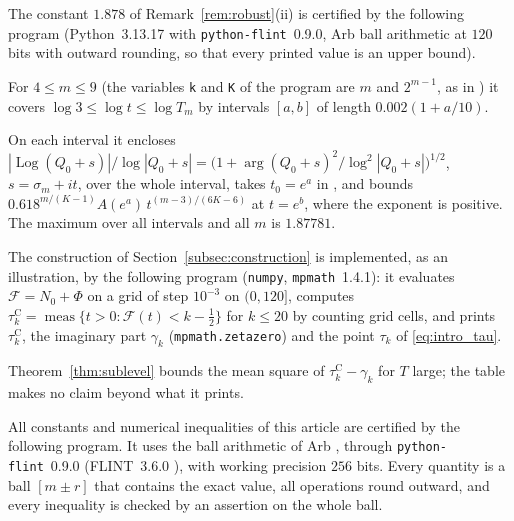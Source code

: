 \documentclass[11pt,a4paper]{article}
\makeatletter
\numberwithin{equation}{section}
\DeclareRobustCommand{\CGref}[1]{\ref{#1}}
\DeclareRobustCommand{\CGeqref}[1]{\eqref{#1}}
\DeclareRobustCommand{\CGcite}[2][]{\if\relax\detokenize{#1}\relax\cite{#2}\else\cite[#1]{#2}\fi}
\let\CG@origref\ref
\let\CG@origeqref\eqref
\newcommand{\CG@gettip}[1]{\@ifundefined{CGTip@#1}{#1}{\csname CGTip@#1\endcsname}}
\newcommand{\CG@getbib}[1]{\@ifundefined{CGBib@#1}{#1}{\csname CGBib@#1\endcsname}}
\DeclareRobustCommand{\CGref}[1]{\pdftooltip{\CG@origref{#1}}{\CG@gettip{#1}}}
\DeclareRobustCommand{\CGeqref}[1]{\pdftooltip{\CG@origeqref{#1}}{\CG@gettip{#1}}}
\DeclareRobustCommand{\CGcite}[2][]{\pdftooltip{\if\relax\detokenize{#1}\relax\cite{#2}\else\cite[#1]{#2}\fi}{\CG@getbib{#2}}}
\theoremstyle{definition}
\theoremstyle{remark}
\newcommand{\Nz}{N_0} %
\newcommand{\Fc}{\mathcal F}
\newcommand{\Ph}{\Phi}
\newcommand{\meas}{\operatorname{meas}}
\makeatother
\begin{document}




The constant $1.878$ of Remark~\CGref{rem:robust}(ii) is certified by the following program (Python~3.13.17 with \texttt{python-flint}~0.9.0, Arb ball arithmetic \CGcite{Johansson2017} at $120$ bits with outward rounding, so that every printed value is an upper bound).

For $4\le m\le9$ (the variables \texttt{k} and \texttt{K} of the program are $m$ and $2^{m-1}$, as in \CGcite[\S3]{Yang2024}) it covers $\log3\le\log t\le\log T_m$ by intervals $[a,b]$ of length $0.002(1+a/10)$.

On each interval it encloses $|\operatorname{Log}(Q_0+s)|/\log|Q_0+s|=\bigl(1+\arg(Q_0+s)^2/\log^2|Q_0+s|\bigr)^{1/2}$, $s=\sigma_m+it$, over the whole interval, takes $t_0=e^a$ in \CGcite[(3.12)]{Yang2024}, and bounds $0.618^{m/(K-1)}A(e^a)\,t^{(m-3)/(6K-6)}$ at $t=e^b$, where the exponent is positive. The maximum over all intervals and all $m$ is $1.87781$.





The construction of Section~\CGref{subsec:construction} is implemented, as an illustration, by the following program (\texttt{numpy}, \texttt{mpmath}~1.4.1): it evaluates $\Fc=\Nz+\Ph$ on a grid of step $10^{-3}$ on $(0,120]$, computes $\tau_{k}^{\mathrm C}=\meas\{t>0:\Fc(t)<k-\frac12\}$ for $k\le20$ by counting grid cells, and prints $\tau_{k}^{\mathrm C}$, the imaginary part $\gamma_k$ (\texttt{mpmath.zetazero}) and the point $\tau_k$ of \CGeqref{eq:intro_tau}.

Theorem~\CGref{thm:sublevel} bounds the mean square of $\tau_{k}^{\mathrm C}-\gamma_k$ for $T$ large; the table makes no claim beyond what it prints.





All constants and numerical inequalities of this article are certified by the following program. It uses the ball arithmetic of Arb \CGcite{Johansson2017}, through \texttt{python-flint}~0.9.0 (FLINT~3.6.0 \CGcite{FLINT}), with working precision $256$ bits. Every quantity is a ball $[m\pm r]$ that contains the exact value, all operations round outward, and every inequality is checked by an assertion on the whole ball.
\end{document}
